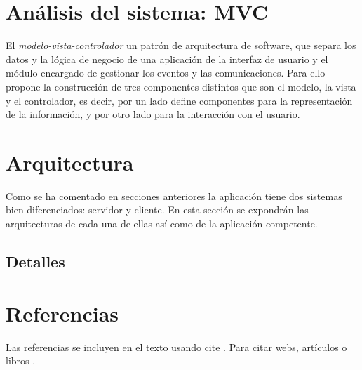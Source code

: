 \section{Análisis del sistema: MVC}\label{analisis-sistema-mvc}

El \emph{modelo-vista-controlador} un patrón de arquitectura de software, que separa los datos y la lógica de negocio de una aplicación de la interfaz de usuario y el módulo encargado de gestionar los eventos y las comunicaciones. Para ello propone la construcción de tres componentes distintos que son el modelo, la vista y el controlador, es decir, por un lado define componentes para la representación de la información, y por otro lado para la interacción con el usuario.





\section{Arquitectura}\label{arquitectura}

Como se ha comentado en secciones anteriores la aplicación tiene dos sistemas bien diferenciados: servidor y cliente. En esta sección se expondrán las arquitecturas de cada una de ellas así como de la aplicación competente.


\subsection{Detalles}\label{detalles}



\section{Referencias}

Las referencias se incluyen en el texto usando cite \cite{wiki:mvc} \cite{}. Para citar webs, artículos o libros \cite{koza92}.

